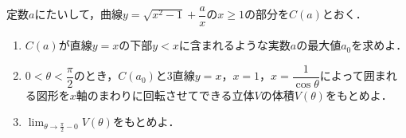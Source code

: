 \documentclass[../../main.tex]{subfiles}
\begin{document}
定数$a$にたいして，曲線$y=\sqrt{x^2-1}+\dfrac{a}{x}$の$x\ge 1$の部分を$C(a)$とおく．

\begin{enumerate}
  \item $C(a)$が直線$y=x$の下部$y<x$に含まれるような実数$a$の最大値$a_0$を求めよ．
  \item $0<\theta<\dfrac{\pi}{2}$のとき，$C(a_0)$と$3$直線$y=x$，$x=1$，$x=\dfrac{1}{\cos\theta}$によって囲まれる図形を$x$軸のまわりに回転させてできる立体$V$の体積$V(\theta)$をもとめよ．
  \item $\lim_{\theta\to\frac{\pi}{2}-0}V(\theta)$をもとめよ．
\end{enumerate}
\end{document}
